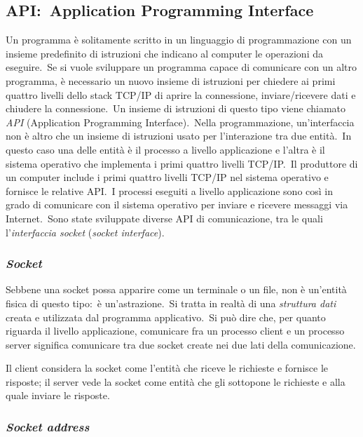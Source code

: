 \subsection{API:\ Application Programming Interface}

Un programma è solitamente scritto in un linguaggio di programmazione con un insieme predefinito di istruzioni che indicano al computer le operazioni da eseguire.\
Se si vuole sviluppare un programma capace di comunicare con un altro programma, è necessario un nuovo insieme di istruzioni per chiedere ai primi quattro livelli dello stack TCP/IP di aprire la connessione, inviare/ricevere dati e chiudere la connessione.\
Un insieme di istruzioni di questo tipo viene chiamato \emph{API} (Application Programming Interface).\
Nella programmazione, un'interfaccia non è altro che un insieme di istruzioni usato per l'interazione tra due entità.\
In questo caso una delle entità è il processo a livello applicazione e l'altra è il sistema operativo che implementa i primi quattro livelli TCP/IP.\
Il produttore di un computer include i primi quattro livelli TCP/IP nel sistema operativo e fornisce le relative API.\
I processi eseguiti a livello applicazione sono così in grado di comunicare con il sistema operativo per inviare e ricevere messaggi via Internet.\
Sono state sviluppate diverse API di comunicazione, tra le quali l'\emph{interfaccia socket} (\emph{socket interface}).

\subsubsection{\emph{Socket}}

Sebbene una socket possa apparire come un terminale o un file, non è un'entità fisica di questo tipo:\ è un'astrazione.\
Si tratta in realtà di una \emph{struttura dati} creata e utilizzata dal programma applicativo.\
Si può dire che, per quanto riguarda il livello applicazione, comunicare fra un processo client e un processo server significa comunicare tra due socket create nei due lati della comunicazione.

Il client considera la socket come l'entità che riceve le richieste e fornisce le risposte; il server vede la socket come entità che gli sottopone le richieste e alla quale inviare le risposte.

\subsubsection{\emph{Socket address}}

